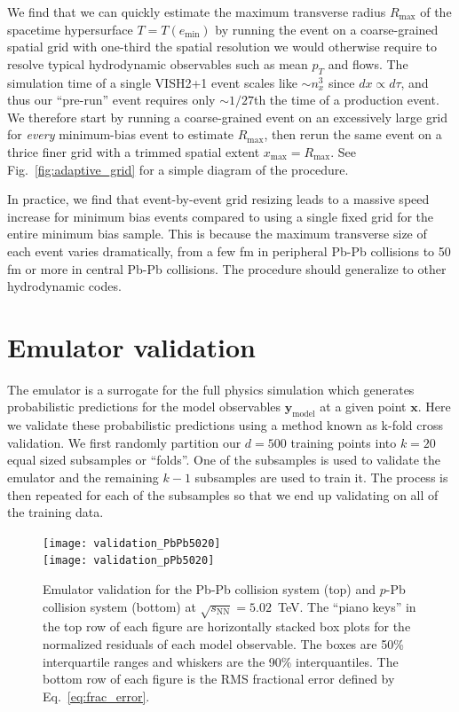 \documentclass[aps,prc,reprint,amsmath,nofootinbib]{revtex4-1}
\newcommand{\sqrts}{\sqrt{s_\mathrm{NN}}}
\newcommand{\xv}{\mathbf x}
\newcommand{\ym}{{\mathbf y}_\text{model}}
\begin{document}
We find that we can quickly estimate the maximum transverse radius $R_\text{max}$ of the spacetime hypersurface ${T = T(e_\text{min})}$ by running the event on a coarse-grained spatial grid with one-third the spatial resolution we would otherwise require to resolve typical hydrodynamic observables such as mean $p_T$ and flows.
The simulation time of a single VISH2+1 event scales like ${\sim}n_x^3$ since $dx \propto d\tau$, and thus our ``pre-run'' event requires only ${\sim}1/27$th the time of a production event.
We therefore start by running a coarse-grained event on an excessively large grid for \emph{every} minimum-bias event to estimate $R_\text{max}$, then rerun the same event on a thrice finer grid with a trimmed spatial extent $x_\text{max} = R_\text{max}$.
See Fig.~\ref{fig:adaptive_grid} for a simple diagram of the procedure.

In practice, we find that event-by-event grid resizing leads to a massive speed increase for minimum bias events compared to using a single fixed grid for the entire minimum bias sample.
This is because the maximum transverse size of each event varies dramatically, from a few fm in peripheral Pb-Pb collisions to 50 fm or more in central Pb-Pb collisions.
The procedure should generalize to other hydrodynamic codes.

\section{Emulator validation}
\label{app:validation}

The emulator is a surrogate for the full physics simulation which generates probabilistic predictions for the model observables $\ym$ at a given point $\xv$.
Here we validate these probabilistic predictions using a method known as k-fold cross validation.
We first randomly partition our $d=500$ training points into $k=20$ equal sized subsamples or ``folds''.
One of the subsamples is used to validate the emulator and the remaining $k-1$ subsamples are used to train it.
The process is then repeated for each of the subsamples so that we end up validating on all of the training data.

\begin{figure}[t]
  \texttt{[image: validation\_PbPb5020]}\\
  \texttt{[image: validation\_pPb5020]}
  \caption{
    \label{fig:validation_all}
    Emulator validation for the Pb-Pb collision system (top) and $p$-Pb collision system (bottom) at $\sqrts=5.02$~TeV.
    The ``piano keys'' in the top row of each figure are horizontally stacked box plots for the normalized residuals of each model observable.
    The boxes are 50\% interquartile ranges and whiskers are the 90\% interquantiles.
    The bottom row of each figure is the RMS fractional error defined by Eq.~\eqref{eq:frac_error}.
  }
\end{figure}
\end{document}
